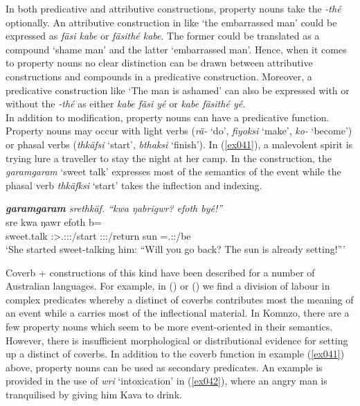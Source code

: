 In both predicative and attributive constructions, property nouns take the  \emph{-thé} optionally. An attributive construction in  like `the embarrassed man' could be expressed as \emph{fäsi kabe} or \emph{fäsithé kabe}. The former could be translated as a compound `shame man' and the latter `embarrassed man'. Hence, when it comes to property nouns no clear distinction can be drawn between attributive constructions and  compounds in a predicative construction. Moreover, a predicative construction like  `The man is ashamed' can also be expressed with or without the  \emph{-thé} as either \emph{kabe fäsi yé} or \emph{kabe fäsithé yé}.\\

In addition to  modification, property nouns can have a predicative function. Property nouns may occur with light verbs (\emph{rä-} `do', \emph{fiyoksi} `make', \emph{ko-} `become') or phasal verbs (\emph{thkäfsi} `start', \emph{bthaksi} `finish'). In (\ref{ex041}), a malevolent spirit is trying lure a traveller to stay the night at her camp. In the construction, the  \emph{garamgaram} `sweet talk' expresses most of the semantics of the event while the phasal verb \emph{thkäfksi} `start' takes the inflection and indexing.

\begin{exe}
	\ex \emph{\textbf{garamgaram} srethkäf. ``kwa ŋabrigwr? efoth byé!''}\\
	 sre kwa ŋawr efoth b=\\
	sweet.talk \Stsg{}:\Sbj{}>\Tsg{}.\Masc{}:\Obj{}:\Irr{}:\Pfv{}/start \Fut{} \Stsg{}:\Sbj:\Nonpast:\Ipfv/return sun \Med{}=\Tsg{}.\Masc{}:\Nonpast:\Ipfv/be\\
	\trans `She started sweet-talking him: ``Will you go back? The sun is already setting!'''
	\label{ex041}
\end{exe}

Coverb +  constructions of this kind have been described for a number of Australian languages. For example, in  (\citealt{SchultzeBerndt:2000wk}) or  (\citealt{Meakins:ul}) we find a division of labour in complex predicates whereby a distinct  of coverbs contributes most the meaning of an event while a  carries most of the inflectional material. In Komnzo, there are a few property nouns which seem to be more event-oriented in their semantics. However, there is insufficient morphological or distributional evidence for setting up a distinct  of coverbs. In addition to the coverb function in example (\ref{ex041}) above, property nouns can be used as secondary predicates. An example is provided in the use of \emph{wri} `intoxication' in (\ref{ex042}), where an angry man is tranquilised by giving him Kava to drink.

